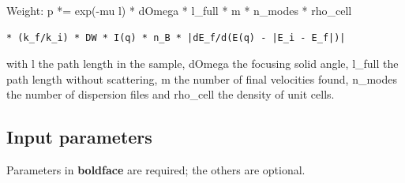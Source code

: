 Weight: p *= exp(-mu l) * dOmega * l\_full * m * n\_modes * rho\_cell

\begin{verbatim}
* (k_f/k_i) * DW * I(q) * n_B * |dE_f/d(E(q) - |E_i - E_f|)|
\end{verbatim}

with l the path length in the sample, dOmega the focusing solid angle, l\_full the path length without scattering, m the number of final velocities found, n\_modes the number of dispersion files and rho\_cell the density of unit cells.

\subsection*{Input parameters}
Parameters in \textbf{boldface} are required; the others are optional.

